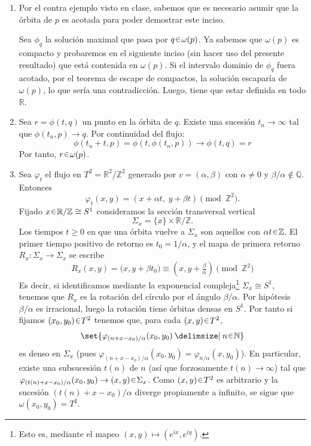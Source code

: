 \begin{sol}
\begin{enumerate}[label=\textbf{(\alph*)}]
\item{}
Por el contra ejemplo visto en clase, sabemos que es necesario asumir que la órbita de $p$ es acotada para poder demostrar este inciso. 

Sea $\phi_q$ la solución maximal que pasa por $q \en \omega(p)$. Ya sabemos que $\omega(p)$ es compacto y probaremos en el siguiente inciso (sin hacer uso del presente resultado) que está contenida en $\omega(p)$. Si el intervalo dominio de $\phi_q$ fuera acotado, por el teorema de escape de compactos, la solución escaparía de $\omega(p)$, lo que sería una contradicción. Luego, tiene que estar definida en todo $\mathbb{R}$.

\item{}
Sea $r = \phi(t,q)$ un punto en la órbita de $q$. Existe una sucesión $t_n \to \infty$ tal que $\phi(t_n,p) \to q$. Por continuidad del flujo:
\[
\phi(t_n + t,p) = \phi(t,\phi(t_n,p)) \to \phi(t,q) = r
\]
Por tanto, $r \en \omega(p)$.

\item{} 
Sea $\varphi_t$ el flujo en $T^2=\mathbb R^2/\mathbb Z^2$ generado por $v=(\alpha,\beta)$ con $\alpha\neq0$ y $\beta/\alpha\notin\mathbb Q$. Entonces
\[
\varphi_t(x,y)=(x+\alpha t,\;y+\beta t)\pmod{\mathbb Z^2}.
\]
Fijado $x\en \mathbb R/\mathbb Z \cong S^1$ consideramos la sección transversal vertical
\[
\Sigma_x=\{x\}\times \mathbb R/\mathbb Z.
\]
Los tiempos $t\ge0$ en que una órbita vuelve a $\Sigma_x$ son aquellos con $\alpha t\en\mathbb Z$. El primer tiempo positivo de retorno es $t_0=1/\alpha$, y el mapa de primera retorno
$R_x:\Sigma_x\to\Sigma_x$ se escribe
\[
R_x(x,y)=\big(x,y+\beta t_0\big)\equiv (x,y+\tfrac{\beta}{\alpha})\pmod{\mathbb Z^2}
\]
Es decir, si identificamos mediante la exponencial compleja\footnote{Esto es, mediante el mapeo $(x,y) \mapsto (e^{ix},e^{iy})$.} $\Sigma_x \cong S^1$, tenemos que $R_x$ es la rotación del círculo por el ángulo $\beta/\alpha$. Por hipótesis $\beta/\alpha$ es irracional, luego la rotación tiene órbitas densas en $S^1$. Por tanto si fijamos $(x_0,y_0) \en T^2$ tenemos que, para cada $(x,y) \en T^2$,
\[
\set{\varphi_{(n+x-x_0)/\alpha}(x_0,y_0) \given n\en \mathbb{N}}
\]
es denso en $\Sigma_{x}$ (pues $\varphi_{(n+x-x_0)/\alpha}(x_0,y_0) = \varphi_{n/\alpha}(x,y_0)$). En particular, existe una subsucesión $t(n)$ de $n$ (así que forzosamente $t(n) \to \infty$) tal que $\varphi_{(t(n)+x-x_0)/\alpha}(x_0,y_0) \to (x,y) \en \Sigma_x$. Como $(x,y) \en T^2$ es arbitrario y la sucesión $(t(n)+x-x_0)/\alpha$ diverge propiamente a infinito, se sigue que $\omega(x_0,y_0) = T^2$.
\end{enumerate}
\end{sol}